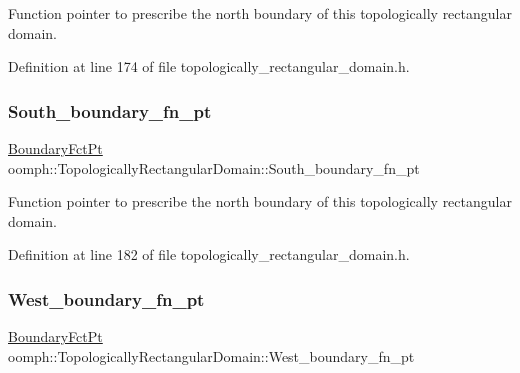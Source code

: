 Function pointer to prescribe the north boundary of this topologically rectangular domain. 



Definition at line 174 of file topologically\+\_\+rectangular\+\_\+domain.\+h.

\mbox{\label{classoomph_1_1TopologicallyRectangularDomain_a48aa6d308f504b63b6f080ed486a1248}} 
\subsubsection{\texorpdfstring{South\+\_\+boundary\+\_\+fn\+\_\+pt}{South\_boundary\_fn\_pt}}
{\footnotesize\ttfamily \hyperlink{classoomph_1_1TopologicallyRectangularDomain_a8b2e24f5500d86c93aef509c5410e7cc}{Boundary\+Fct\+Pt} oomph\+::\+Topologically\+Rectangular\+Domain\+::\+South\+\_\+boundary\+\_\+fn\+\_\+pt\hspace{0.3cm}{\ttfamily [private]}}



Function pointer to prescribe the north boundary of this topologically rectangular domain. 



Definition at line 182 of file topologically\+\_\+rectangular\+\_\+domain.\+h.

\mbox{\label{classoomph_1_1TopologicallyRectangularDomain_ab565242c7de0d10b36ec0a2e7a219bf9}} 
\subsubsection{\texorpdfstring{West\+\_\+boundary\+\_\+fn\+\_\+pt}{West\_boundary\_fn\_pt}}
{\footnotesize\ttfamily \hyperlink{classoomph_1_1TopologicallyRectangularDomain_a8b2e24f5500d86c93aef509c5410e7cc}{Boundary\+Fct\+Pt} oomph\+::\+Topologically\+Rectangular\+Domain\+::\+West\+\_\+boundary\+\_\+fn\+\_\+pt\hspace{0.3cm}{\ttfamily [private]}}



